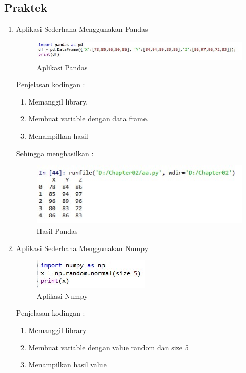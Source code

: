 \subsection{Praktek}
\begin{enumerate}
\item Aplikasi Sederhana Menggunakan Pandas
	\begin{figure}[ht]
	\centering
	\includegraphics[scale=0.5]{figures/k1a.jpg}
	\caption{Aplikasi Pandas}
	\label{contoh}
	\end{figure}
	\par Penjelasan kodingan :
		\begin{enumerate}
		\item Memanggil library.
		\item Membuat variable dengan data frame.
		\item Menampilkan hasil
		\end{enumerate}
	\par Sehingga menghasilkan :
	\begin{figure}[ht]
	\centering
	\includegraphics[scale=0.5]{figures/k1b.jpg}
	\caption{Hasil Pandas}
	\label{contoh}
	\end{figure}
\item Aplikasi Sederhana Menggunakan Numpy
	\begin{figure}[ht]
	\centering
	\includegraphics[scale=0.5]{figures/k2a.jpg}
	\caption{Aplikasi Numpy}
	\label{contoh}
	\end{figure}
	\par Penjelasan kodingan :
		\begin{enumerate}
		\item Memanggil library
		\item Membuat variable dengan value random dan size 5
		\item Menampilkan hasil value

\end{enumerate}
\end{enumerate}

